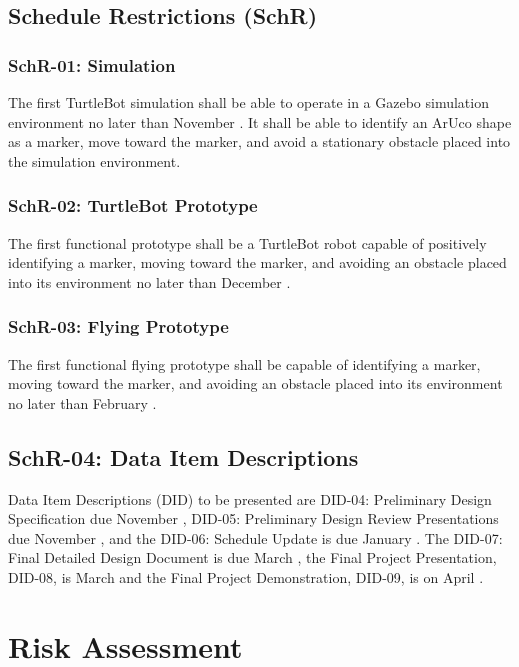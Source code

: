 \documentclass{article}
\begin{document}
	\subsection{Schedule Restrictions (SchR)}
	
		\subsubsection{SchR-01: Simulation}
		
		The first TurtleBot simulation shall be able to operate in a Gazebo simulation environment no later than November . It shall be able to identify an ArUco shape as a marker, move toward the marker, and avoid a stationary obstacle placed into the simulation environment.
		
		\subsubsection{SchR-02: TurtleBot Prototype}
		
		The first functional prototype shall be a TurtleBot robot capable of positively identifying a marker, moving toward the marker, and avoiding an obstacle placed into its environment no later than December .
		
		\subsubsection{SchR-03: Flying Prototype}
		
		The first functional flying prototype shall be capable of identifying a marker, moving toward the marker, and avoiding an obstacle placed into its environment no later than February  .

		\subsection{SchR-04: Data Item Descriptions}
		Data Item Descriptions (DID) to be presented are DID-04: Preliminary Design Specification due November , DID-05: Preliminary Design Review Presentations due November , and the DID-06: Schedule Update is due January . The DID-07: Final Detailed Design Document is due March , the Final Project Presentation, DID-08, is March  and the Final Project Demonstration, DID-09, is on April . 
		

\section{Risk Assessment}
\end{document}
